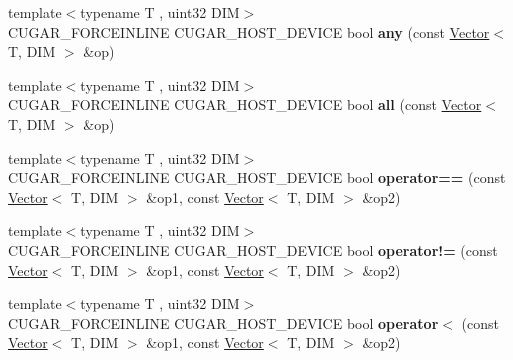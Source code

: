 \begin{DoxyCompactItemize}
\item 
\mbox{\label{namespacecugar_affae4de65af1d2cbae94b7211c6e158b}} 
{\footnotesize template$<$typename T , uint32 D\+IM$>$ }\\C\+U\+G\+A\+R\+\_\+\+F\+O\+R\+C\+E\+I\+N\+L\+I\+NE C\+U\+G\+A\+R\+\_\+\+H\+O\+S\+T\+\_\+\+D\+E\+V\+I\+CE bool {\bfseries any} (const \hyperlink{structcugar_1_1_vector}{Vector}$<$ T, D\+IM $>$ \&op)
\item 
\mbox{\label{namespacecugar_a84522011165f21c42aca99774395dca4}} 
{\footnotesize template$<$typename T , uint32 D\+IM$>$ }\\C\+U\+G\+A\+R\+\_\+\+F\+O\+R\+C\+E\+I\+N\+L\+I\+NE C\+U\+G\+A\+R\+\_\+\+H\+O\+S\+T\+\_\+\+D\+E\+V\+I\+CE bool {\bfseries all} (const \hyperlink{structcugar_1_1_vector}{Vector}$<$ T, D\+IM $>$ \&op)
\item 
\mbox{\label{namespacecugar_aab7d6bf5369d92ab905742b62de90019}} 
{\footnotesize template$<$typename T , uint32 D\+IM$>$ }\\C\+U\+G\+A\+R\+\_\+\+F\+O\+R\+C\+E\+I\+N\+L\+I\+NE C\+U\+G\+A\+R\+\_\+\+H\+O\+S\+T\+\_\+\+D\+E\+V\+I\+CE bool {\bfseries operator==} (const \hyperlink{structcugar_1_1_vector}{Vector}$<$ T, D\+IM $>$ \&op1, const \hyperlink{structcugar_1_1_vector}{Vector}$<$ T, D\+IM $>$ \&op2)
\item 
\mbox{\label{namespacecugar_ab4c27f402aee687092ec88efd34dda6e}} 
{\footnotesize template$<$typename T , uint32 D\+IM$>$ }\\C\+U\+G\+A\+R\+\_\+\+F\+O\+R\+C\+E\+I\+N\+L\+I\+NE C\+U\+G\+A\+R\+\_\+\+H\+O\+S\+T\+\_\+\+D\+E\+V\+I\+CE bool {\bfseries operator!=} (const \hyperlink{structcugar_1_1_vector}{Vector}$<$ T, D\+IM $>$ \&op1, const \hyperlink{structcugar_1_1_vector}{Vector}$<$ T, D\+IM $>$ \&op2)
\item 
\mbox{\label{namespacecugar_a2df5a55359765b2360d6da27ad395335}} 
{\footnotesize template$<$typename T , uint32 D\+IM$>$ }\\C\+U\+G\+A\+R\+\_\+\+F\+O\+R\+C\+E\+I\+N\+L\+I\+NE C\+U\+G\+A\+R\+\_\+\+H\+O\+S\+T\+\_\+\+D\+E\+V\+I\+CE bool {\bfseries operator$<$} (const \hyperlink{structcugar_1_1_vector}{Vector}$<$ T, D\+IM $>$ \&op1, const \hyperlink{structcugar_1_1_vector}{Vector}$<$ T, D\+IM $>$ \&op2)
\item 

\end{DoxyCompactItemize}
